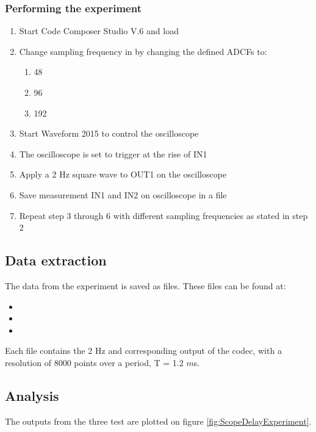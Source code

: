 \subsubsection{Performing the experiment}
\begin{enumerate}
	\item Start Code Composer Studio V.6 and load 
	\item Change sampling frequency in  by changing the defined ADCFs to:
	\begin{enumerate}
		\item 48
		\item 96
		\item 192
	\end{enumerate}
	\item Start Waveform 2015 to control the oscilloscope
	\item The oscilloscope is set to trigger at the rise of IN1
	\item Apply a 2 Hz square wave to OUT1 on the oscilloscope
	\item Save measurement IN1 and IN2 on oscilloscope in a  file
	\item Repeat step 3 through 6 with different sampling frequencies as stated in step 2
\end{enumerate}

\subsection{Data extraction}

The data from the experiment is saved as  files. These files can be found at:
\begin{itemize}
	\item {}
	\item {}
	\item {}
\end{itemize}

Each file contains the 2 Hz and corresponding output of the codec, with a resolution of 8000 points over a period, T = 1.2 $m$s.


\subsection{Analysis}\label{sec:AnalysisFsDelay}
The outputs from the three test are plotted on figure \ref{fig:ScopeDelayExperiment}.

